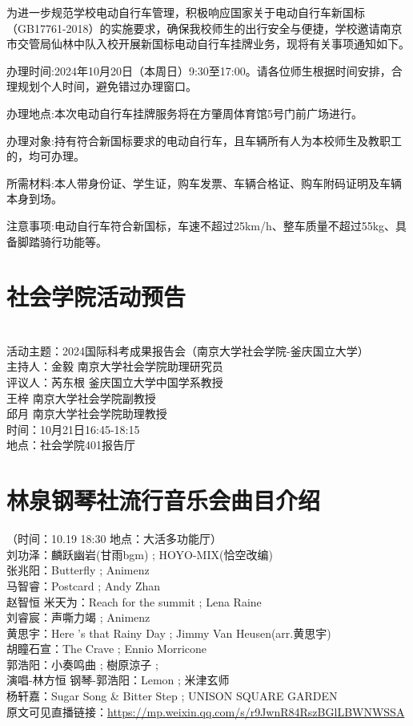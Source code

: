\documentclass[letterpaper, 12pt]{article}
\begin{document}
\begin{multicols}{2}
为进一步规范学校电动自行车管理，积极响应国家关于电动自行车新国标（GB17761-2018）的实施要求，确保我校师生的出行安全与便捷，学校邀请南京市交管局仙林中队入校开展新国标电动自行车挂牌业务，现将有关事项通知如下。

办理时间:2024年10月20日（本周日）9:30至17:00。请各位师生根据时间安排，合理规划个人时间，避免错过办理窗口。

办理地点:本次电动自行车挂牌服务将在方肇周体育馆5号门前广场进行。

办理对象:持有符合新国标要求的电动自行车，且车辆所有人为本校师生及教职工的，均可办理。

所需材料:本人带身份证、学生证，购车发票、车辆合格证、购车附码证明及车辆本身到场。

注意事项:电动自行车符合新国标，车速不超过25km/h、整车质量不超过55kg、具备脚踏骑行功能等。

\section{社会学院活动预告}
\\活动主题：2024国际科考成果报告会（南京大学社会学院-釜庆国立大学）
\\主持人：金毅 南京大学社会学院助理研究员
\\评议人：芮东根 釜庆国立大学中国学系教授
\\      王梓    南京大学社会学院副教授
\\       邱月    南京大学社会学院助理教授
\\时间：10月21日16:45-18:15
\\地点：社会学院401报告厅

\section{林泉钢琴社流行音乐会曲目介绍}
（时间：10.19 18:30 地点：大活多功能厅）\\
刘功泽：麟跃幽岩(甘雨bgm) ; HOYO-MIX(恰空改编)\\
张兆阳：Butterfly ; Animenz\\
马智睿：Postcard ; Andy Zhan\\
赵智恒 米天为：Reach for the summit ; Lena Raine\\
刘睿宸：声嘶力竭 ; Animenz\\
黄思宇：Here 's that Rainy Day ; Jimmy Van Heusen(arr.黄思宇)\\
胡瞳石宣：The Crave ; Ennio Morricone\\
郭浩阳：小奏鸣曲 ; 樹原涼子 ;\\
演唱-林方恒 钢琴-郭浩阳：Lemon ; 米津玄师\\
杨轩嘉：Sugar Song & Bitter Step ; UNISON SQUARE GARDEN\\
原文可见直播链接：\url{https://mp.weixin.qq.com/s/r9JwnR84RszBGlLBWNWSSA}


\end{multicols}
\end{document}
